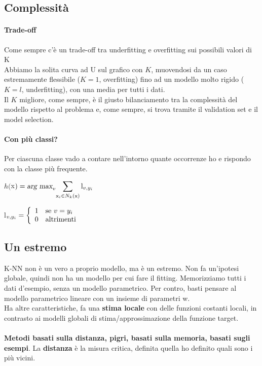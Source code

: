 \documentclass[10pt]{book}
\begin{document}
\subsection{Complessità}
\paragraph{Trade-off} Come sempre c'è un trade-off tra underfitting e overfitting sui possibili valori di K\\
Abbiamo la solita curva ad U sul grafico con $K$, muovendosi da un caso estremamente flessibile ($K=1$, overfitting) fino ad un modello molto rigido ($K=l$, underfitting), con una media per tutti i dati.\\
Il $K$ migliore, come sempre, è il giusto bilanciamento tra la complessità del modello rispetto al problema e, come sempre, si trova tramite il validation set e il model selection.
\paragraph{Con più classi?} Per ciascuna classe vado a contare nell'intorno quante occorrenze ho e rispondo con la classe più frequente.
\begin{list}{}{}
	\item $h($x$) = \textsl{arg max}_v \mathlarger{\sum_{\text{x}_i\in N_k(\text{x})}\text{l}_{v, y_i}}$
	\item l$_{v, y_i} = \left\{\begin{array}{l l}
	1 & \text{se } v = y_i\\
	0 & \text{altrimenti}
\end{array}	 \right.$
\end{list}
\subsection{Un estremo} K-NN non è un vero a proprio modello, ma è un estremo. Non fa un'ipotesi globale, quindi non ha un modello per cui fare il fitting. Memorizziamo tutti i dati d'esempio, senza un modello parametrico. Per contro, basti pensare al modello parametrico lineare con un insieme di parametri w.\\
Ha altre caratteristiche, fa una \textbf{stima locale} con delle funzioni costanti locali, in contrasto ai modelli globali di stima/approssimazione della funzione target.\\\\
\textbf{Metodi basati sulla distanza, pigri, basati sulla memoria, basati sugli esempi}. La \textbf{distanza} è la misura critica, definita quella ho definito quali sono i più vicini.
\end{document}
